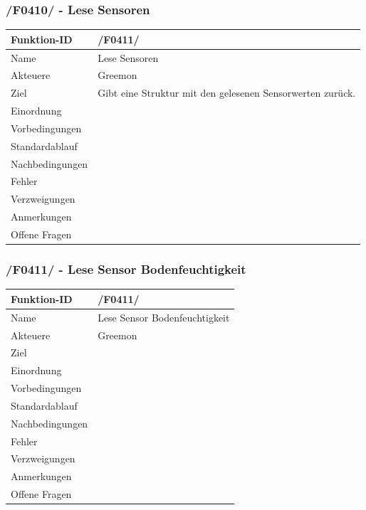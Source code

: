 \documentclass[pointlessnumbers]{scrartcl}
\begin{document}
 \subsubsection{/F0410/ - Lese Sensoren}
 \begin{tabular}{|p{\BreiteErsterTab}|p{\BreiteZweiterTab}|}\hline
    Funktion-ID &       /F0411/  
                        \\ \hline
    Name &              Lese Sensoren
                        \\ \hline
    Akteuere &          Greemon
                        \\ \hline
    Ziel &              Gibt eine Struktur mit den gelesenen Sensorwerten zurück.
                        \\ \hline
    Einordnung &        
                        \\ \hline
    Vorbedingungen &    
                        \\ \hline
    Standardablauf &    
                        \\ \hline
    Nachbedingungen &   
                        \\ \hline
    Fehler &       
                        \\ \hline
    Verzweigungen &     
                        \\ \hline
    Anmerkungen &       
                        \\ \hline
    Offene Fragen &     
                        \\ \hline
 \end{tabular} 

 \subsubsection{/F0411/ - Lese Sensor Bodenfeuchtigkeit}
 \begin{tabular}{|p{\BreiteErsterTab}|p{\BreiteZweiterTab}|}\hline
    Funktion-ID &       /F0411/  
                        \\ \hline
    Name &              Lese Sensor Bodenfeuchtigkeit
                        \\ \hline
    Akteuere &          Greemon
                        \\ \hline
    Ziel &             
                        \\ \hline
    Einordnung &        
                        \\ \hline
    Vorbedingungen &    
                        \\ \hline
    Standardablauf &    
                        \\ \hline
    Nachbedingungen &   
                        \\ \hline
    Fehler &       
                        \\ \hline
    Verzweigungen &     
                        \\ \hline
    Anmerkungen &       
                        \\ \hline
    Offene Fragen &     
                        \\ \hline
 \end{tabular} 
\end{document}
